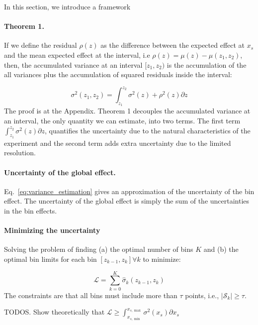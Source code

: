 \documentclass[twoside]{article}
\begin{document}
In this section, we introduce a framework 

\paragraph{Theorem 1.} If we define the residual \(\rho(z)\) as the
difference between the expected effect at \(x_s\) and the mean
expected effect at the interval, i.e
\(\rho(z) = \mu(z) - \mu(z_1, z_2)\), then, the accumulated variance
at an interval \([z_1, z_2)\) is the accumulation of the all variances
plus the accumulation of squared residuals inside the interval:

\begin{equation}
 \sigma^2(z_1, z_2) = \int_{z_1}^{z_2} \sigma^2(z) + \rho^2(z) \partial z
\end{equation}
%
The proof is at the Appendix. Theorem 1 decouples the accumulated
variance at an interval, the only quantity we can estimate, into two
terms. The first term \(\int_{z_1}^{z_2} \sigma^2(z) \partial z\),
quantifies the uncertainty due to the natural characteristics of the
experiment and the second term adds extra uncertainty due to the
limited resolution.



\paragraph{Uncertainty of the global effect.}

Eq.~\eqref{eq:variance_estimation} gives an approximation of the
uncertainty of the bin effect.
The uncertainty of the global effect is
simply the sum of the uncertainties in the bin effects.

\paragraph{Minimizing the uncertainty}

Solving the problem of finding (a) the optimal number of bins \(K\) and (b) the optimal bin limits for each bin \([z_{k-1}, z_k] \forall k\) to minimize:

\begin{equation}
  \label{eq:1}
  \mathcal{L} = \sum_{k=0}^K \hat{\sigma}_k(z_{k-1}, z_k)
\end{equation}
%
The constraints are that all bins must include more than \(\tau\)
points, i.e., \(|\mathcal{S}_k| \geq \tau\).

\noindent
TODOS. Show theoretically that \(\mathcal{L} \geq \int_{x_{s, \min}}^{x_{s, \max}}\sigma^2(x_s) \partial x_s\)
\end{document}
